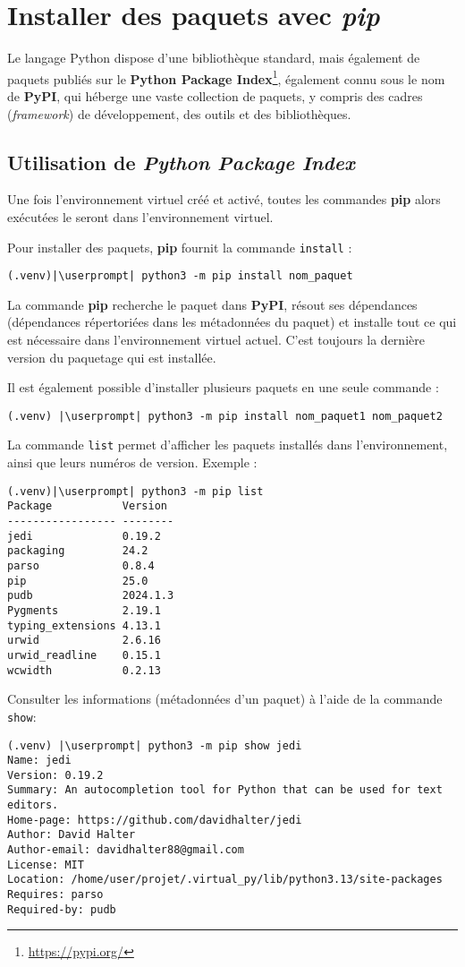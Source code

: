 \section{Installer des paquets avec \textit{pip}}
Le langage Python dispose d'une bibliothèque standard, mais également de paquets publiés sur le \textbf{Python Package Index}\footnote{\url{https://pypi.org/}}, également connu sous le nom de \textbf{PyPI}, qui  héberge une vaste collection de paquets, y compris des cadres (\textit{framework}) de développement, des outils et des bibliothèques.

\subsection*{Utilisation de \textit{Python Package Index}}
Une fois l'environnement virtuel créé et activé, toutes les commandes \textbf{pip} alors exécutées le seront dans l'environnement virtuel.

Pour installer des paquets, \textbf{pip} fournit la commande \texttt{install} : 
\begin{lstlisting}[style=bash]
(.venv)|\userprompt| python3 -m pip install nom_paquet
\end{lstlisting}

La commande \textbf{pip} recherche le paquet dans \textbf{PyPI}, résout ses dépendances (dépendances répertoriées dans les métadonnées du paquet) et installe tout ce qui est nécessaire dans l'environnement virtuel actuel. C'est toujours la dernière version du paquetage qui est installée. 

Il est également possible d'installer plusieurs paquets en une seule commande :
\begin{lstlisting}[style=bash]
(.venv) |\userprompt| python3 -m pip install nom_paquet1 nom_paquet2
\end{lstlisting}

La commande \texttt{list} permet d'afficher les paquets installés dans l'environnement, ainsi que leurs numéros de version. Exemple :
\begin{lstlisting}[style=bash]
(.venv)|\userprompt| python3 -m pip list
Package           Version
----------------- --------
jedi              0.19.2
packaging         24.2
parso             0.8.4
pip               25.0
pudb              2024.1.3
Pygments          2.19.1
typing_extensions 4.13.1
urwid             2.6.16
urwid_readline    0.15.1
wcwidth           0.2.13
\end{lstlisting}

Consulter les informations (métadonnées d'un paquet) à l'aide de la commande \texttt{show}:
\begin{lstlisting}[style=bash]
(.venv) |\userprompt| python3 -m pip show jedi
Name: jedi
Version: 0.19.2
Summary: An autocompletion tool for Python that can be used for text editors.
Home-page: https://github.com/davidhalter/jedi
Author: David Halter
Author-email: davidhalter88@gmail.com
License: MIT
Location: /home/user/projet/.virtual_py/lib/python3.13/site-packages
Requires: parso
Required-by: pudb
\end{lstlisting}

